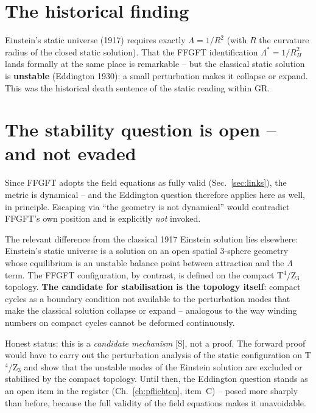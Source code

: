 \section{The historical finding}

Einstein's static universe (1917) requires exactly
$\Lambda = 1/R^2$ (with $R$ the curvature radius of the closed
static solution). That the FFGFT identification
$\Lambda^{*} = 1/R_H^2$ lands formally at the same place is
remarkable -- but the classical static solution is
\textbf{unstable} (Eddington 1930): a small perturbation makes it
collapse or expand. This was the historical death sentence of the
static reading within GR.

\section{The stability question is open -- and not evaded}
\label{sec:stabfrage}

Since FFGFT adopts the field equations as fully valid (Sec.~\ref{sec:links}),
the metric is dynamical -- and the Eddington question therefore
applies here as well, in principle. Escaping via \enquote{the
geometry is not dynamical} would contradict FFGFT's own position and
is explicitly \emph{not} invoked.

The relevant difference from the classical 1917 Einstein solution
lies elsewhere: Einstein's static universe is a solution on an open
spatial 3-sphere geometry whose equilibrium is an unstable balance
point between attraction and the $\Lambda$ term. The FFGFT
configuration, by contrast, is defined on the compact
T$^4$/Z$_3$ topology. \textbf{The candidate for stabilisation is
the topology itself}: compact cycles as a boundary condition not
available to the perturbation modes that make the classical
solution collapse or expand -- analogous to the way winding numbers
on compact cycles cannot be deformed continuously.

Honest status: this is a \emph{candidate mechanism} [S], not a
proof. The forward proof would have to carry out the perturbation
analysis of the static configuration on T$^4$/Z$_3$ and show that
the unstable modes of the Einstein solution are excluded or
stabilised by the compact topology. Until then, the Eddington
question stands as an open item in the register (Ch.~\ref{ch:pflichten}, item~C) --
posed more sharply than before, because the full validity of the
field equations makes it unavoidable.


